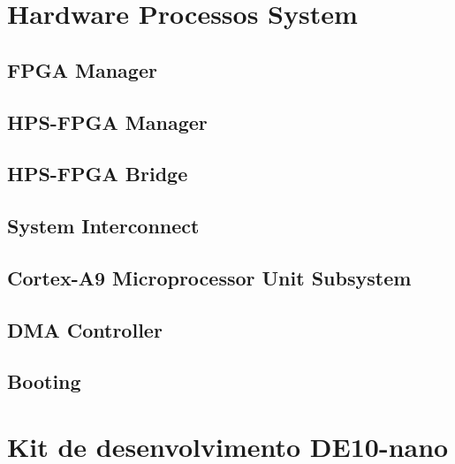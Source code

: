 \section{Hardware Processos System}
\subsection{FPGA Manager}
\subsection{HPS-FPGA Manager}
\subsection{HPS-FPGA Bridge}
\subsection{System Interconnect}
\subsection{Cortex-A9 Microprocessor Unit Subsystem}
\subsection{DMA Controller }
\subsection{Booting}


\section{Kit de desenvolvimento DE10-nano}